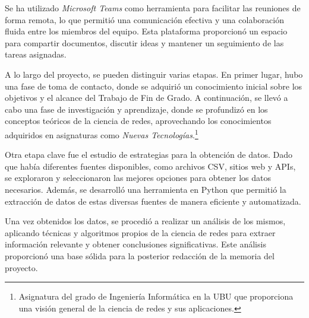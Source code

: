 Se ha utilizado \textit{Microsoft Teams} como herramienta para facilitar las reuniones de forma remota, 
lo que permitió una comunicación efectiva y una colaboración fluida entre los miembros del equipo. 
Esta plataforma proporcionó un espacio para compartir documentos, discutir ideas y mantener un 
seguimiento de las tareas asignadas.

A lo largo del proyecto, se pueden distinguir varias etapas. En primer lugar, hubo una fase de 
toma de contacto, donde se adquirió un conocimiento inicial sobre los objetivos y el alcance del 
Trabajo de Fin de Grado. A continuación, se llevó a cabo una fase de investigación y aprendizaje, 
donde se profundizó en los conceptos teóricos de la ciencia de redes, aprovechando los conocimientos 
adquiridos en asignaturas como \textit{Nuevas Tecnologías}.\footnote{Asignatura del grado de Ingeniería 
Informática en la UBU que proporciona una visión general de la ciencia de redes y sus aplicaciones.}

Otra etapa clave fue el estudio de estrategias para la obtención de datos. Dado que había 
diferentes fuentes disponibles, como archivos CSV, sitios web y APIs, se exploraron y 
seleccionaron las mejores opciones para obtener los datos necesarios. Además, se desarrolló 
una herramienta en Python que permitió la extracción de datos de estas diversas fuentes de 
manera eficiente y automatizada.

Una vez obtenidos los datos, se procedió a realizar un análisis de los mismos, aplicando técnicas 
y algoritmos propios de la ciencia de redes para extraer información relevante y obtener conclusiones 
significativas. Este análisis proporcionó una base sólida para la posterior redacción de la memoria 
del proyecto.